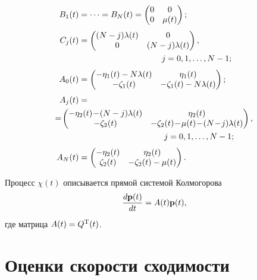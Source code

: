 \begin{multicols}{2}
\noindent
\begin{align*}
B_1(t)&=\cdots= B_N(t) =
\begin{pmatrix}
    0  & 0  \\
    0  & \mu(t) \\
\end{pmatrix};
\\[3pt]
C_j(t) &=
\begin{pmatrix}
    (N-j)\lambda(t)  & 0  \\
    0  & (N-j)\lambda(t) \\
\end{pmatrix},\\
&\hspace*{35mm} j = 0, 1, \ldots, N-1;
\\[3pt]
A_0(t) &=
\begin{pmatrix}
    -\eta_1(t) - N\lambda(t)  & \eta_1(t)  \\
    -\zeta_1(t)  & -\zeta_1(t) - N\lambda(t) \\
\end{pmatrix};
\\[3pt]
A_j(t) &={}\\
&\hspace*{-11mm}{}=\!
\begin{pmatrix}
    -\eta_2(t)\! -\! (N-j)\lambda(t)  & \eta_2(t)  \\
    -\zeta_2(t)  & -\zeta_2(t) \!-\! \mu(t) \!-\! (N\!-\!j)\lambda(t) \\
\end{pmatrix},\\
&\hspace*{36mm} j = 0, 1, \ldots, N-1;
\\[3pt]
A_N(t)& =
\begin{pmatrix}
    -\eta_2(t)  & \eta_2(t)  \\
    \zeta_2(t)  & -\zeta_2(t) - \mu(t)
\end{pmatrix}.
\end{align*}


Процесс $\chi(t)$ описывается прямой сис\-те\-мой Колмогорова
\begin{equation}
    \displaystyle\frac{\displaystyle d\mathbf{p}(t)\mathstrut}{\displaystyle dt\mathstrut} = A(t)\mathbf{p}(t),
    \label{3}
\end{equation}
где мат\-ри\-ца $A(t) \hm= Q^{\mathrm{T}}(t)$.


\section{Оценки скорости сходимости}


\end{multicols}
